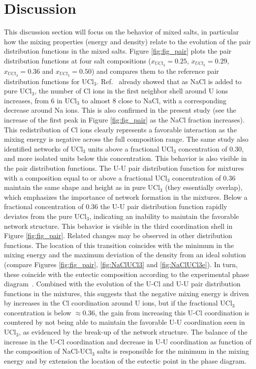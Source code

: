 \documentclass[titlepage=firstiscover,11pt,fleqn,headheight=14pt,footheight=40.8pt]{scrreprt}
\begin{document}
\section{Discussion}
\label{sec:discussion}
This discussion section will focus on the behavior of mixed salts, in particular how the mixing properties (energy and density) relate to the evolution of the pair distribution functions in the mixed salts. Figure \ref{fig:fig_pair} plots the pair distribution functions at four salt compositions ($x_{UCl_3}=0.25$, $x_{UCl_3}=0.29$, $x_{UCl_3}=0.36$ and $x_{UCl_3}=0.50$) and compares them to the reference pair distribution functions for UCl$_3$. 
Ref.~\cite{Li} already showed that as NaCl is added to pure UCl$_3$, the number of Cl ions in the first neighbor shell around U ions increases, from 6 in UCl$_3$ to almost 8 close to NaCl, with a corresponding decrease around Na ions. This is also confirmed in the present study (see the increase of the first peak in Figure \ref{fig:fig_pair} as the NaCl fraction increases). This redistribution of Cl ions clearly represents a favorable interaction as the mixing energy is negative across the full composition range. The same study also identified networks of UCl$_3$ units above a fractional UCl$_3$ concentration of 0.30, and more isolated units below this concentration. This behavior is also visible in the pair distribution functions. The U-U pair distribution function for mixtures with a composition equal to or above a fractional UCl$_3$ concentration of 0.36 maintain the same shape and height as in pure UCl$_3$ (they essentially overlap), which emphasizes the importance of network formation in the mixtures. 
Below a fractional concentration of 0.36 the U-U pair distribution function rapidly deviates from the pure UCl$_3$, indicating an inability to maintain the favorable network structure. This behavior is visible in the third coordination shell in Figure \ref{fig:fig_pair}.
Related changes may be observed in other distribution functions. 
The location of this transition coincides with the minimum in the mixing energy and the maximum deviation of the density from an ideal solution (compare Figures \ref{fig:fig_pair}, \ref{fig:NaClUCl3} and \ref{fig:NaClUCl3e}). In turn, these coincide with the eutectic composition according to the experimental phase diagram~\cite{YIN2020}. Combined with the evolution of the U-Cl and U-U pair distribution functions in the mixtures, this suggests that the negative mixing energy is driven by increases in the Cl coordination around U ions, but if the fractional UCl$_3$ concentration is below $\approx 0.36$, the gain from increasing this U-Cl coordination is countered by not being able to maintain the favorable U-U coordination seen in UCl$_3$, as evidenced by the break-up of the network structure. The balance of the increase in the U-Cl coordination and decrease in U-U coordination as function of the composition of NaCl-UCl$_3$ salts is responsible for the minimum in the mixing energy and by extension the location of the eutectic point in the phase diagram. 
\end{document}
